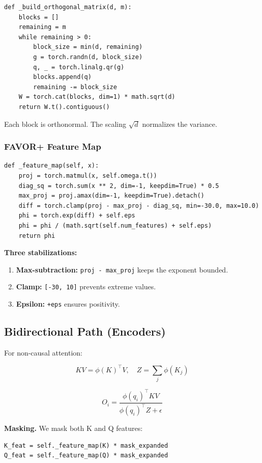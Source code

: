 \begin{lstlisting}
def _build_orthogonal_matrix(d, m):
    blocks = []
    remaining = m
    while remaining > 0:
        block_size = min(d, remaining)
        g = torch.randn(d, block_size)
        q, _ = torch.linalg.qr(g)
        blocks.append(q)
        remaining -= block_size
    W = torch.cat(blocks, dim=1) * math.sqrt(d)
    return W.t().contiguous()
\end{lstlisting}

Each block is orthonormal. The scaling $\sqrt{d}$ normalizes the variance.

\subsubsection{FAVOR+ Feature Map}

\begin{lstlisting}
def _feature_map(self, x):
    proj = torch.matmul(x, self.omega.t())
    diag_sq = torch.sum(x ** 2, dim=-1, keepdim=True) * 0.5
    max_proj = proj.amax(dim=-1, keepdim=True).detach()
    diff = torch.clamp(proj - max_proj - diag_sq, min=-30.0, max=10.0)
    phi = torch.exp(diff) + self.eps
    phi = phi / (math.sqrt(self.num_features) + self.eps)
    return phi
\end{lstlisting}

\textbf{Three stabilizations:}
\begin{enumerate}
\item \textbf{Max-subtraction:} \texttt{proj - max\_proj} keeps the exponent bounded.
\item \textbf{Clamp:} \texttt{[-30, 10]} prevents extreme values.
\item \textbf{Epsilon:} \texttt{+eps} ensures positivity.

\end{enumerate}
\subsection{Bidirectional Path (Encoders)}

For non-causal attention:

\[
KV = \phi(K)^\top V, \quad Z = \sum_j \phi(K_j)
\tag{4.1}
\]

\[
O_i = \frac{\phi(q_i)^\top KV}{\phi(q_i)^\top Z + \epsilon}
\tag{4.2}
\]

\textbf{Masking.} We mask both K and Q features:

\begin{lstlisting}
K_feat = self._feature_map(K) * mask_expanded
Q_feat = self._feature_map(Q) * mask_expanded
\end{lstlisting}

